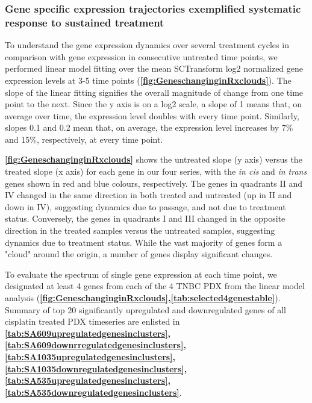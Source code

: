 
\subsubsection{Gene specific expression trajectories exemplified systematic response to sustained treatment}

To understand the gene expression dynamics over several treatment cycles in comparison with gene expression in consecutive untreated time points, we performed linear model fitting over the mean SCTransform log2 normalized gene expression levels at 3-5 time points (\textbf{\autoref{fig:GeneschanginginRxclouds}}). The slope of the linear fitting signifies the overall magnitude of change from one time point to the next. Since the y axis is on a log2 scale, a slope of 1 means that, on average over time, the expression level doubles with every time point. Similarly, slopes 0.1 and 0.2 mean that, on average, the expression level increases by 7\% and 15\%, respectively, at every time point.

\textbf{\autoref{fig:GeneschanginginRxclouds}} shows the untreated slope (y axis) versus the treated slope (x axis) for each gene in our four series, with the \textit{in cis} and \textit{in trans} genes shown in red and blue colours, respectively. The genes in quadrants II and IV changed in the same direction in both treated and untreated (up in II and down in IV), suggesting dynamics due to passage, and not due to treatment status. Conversely, the genes in quadrants I and III changed in the opposite direction in the treated samples versus the untreated samples, suggesting dynamics due to treatment status. While the vast majority of genes form a "cloud" around the origin, a number of genes display significant changes.

 
To evaluate the spectrum of single gene expression at each time point, we designated at least 4 genes from each of the 4 TNBC PDX from the linear model analysis (\textbf{\autoref{fig:GeneschanginginRxclouds},\autoref{tab:selected4genestable}}). Summary of top 20 significantly upregulated and downregulated genes of all cisplatin treated PDX timeseries are enlisted in \textbf{\autoref{tab:SA609upregulatedgenesinclusters}, \autoref{tab:SA609downrregulatedgenesinclusters}, \autoref{tab:SA1035upregulatedgenesinclusters}, \autoref{tab:SA1035downregulatedgenesinclusters}, \autoref{tab:SA535upregulatedgenesinclusters}, \autoref{tab:SA535downregulatedgenesinclusters}}.

